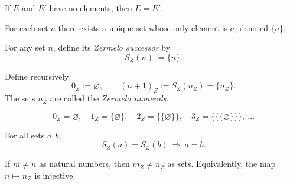 \begin{proposition}
\label{prop:empty-unique}
If $E$ and $E'$ have no elements, then $E=E'$.
\end{proposition}



\begin{proposition}
\label{prop:singleton-well-defined}
For each set $a$ there exists a unique set whose only element is $a$, denoted $\{a\}$.
\end{proposition}



\begin{definition}
\label{def:zermelo-successor}
For any set $n$, define its \emph{Zermelo successor} by
\[
S_Z(n) := \{n\}.
\]
\end{definition}

\begin{definition}
\label{def:zermelo-numerals}
Define recursively:
\[
0_Z := \varnothing,\qquad (n+1)_Z := S_Z(n_Z)=\{n_Z\}.
\]
The sets $n_Z$ are called the \emph{Zermelo numerals}.
\end{definition}

\begin{proposition}
\label{prop:zermelo-first-few}
\[
0_Z=\varnothing,\quad
1_Z=\{\varnothing\},\quad
2_Z=\{\{\varnothing\}\},\quad
3_Z=\{\{\{\varnothing\}\}\},\ \dots
\]
\end{proposition}



\begin{proposition}
\label{prop:zermelo-successor-injective}
For all sets $a,b$,
\[
S_Z(a)=S_Z(b)\ \Rightarrow\ a=b.
\]
\end{proposition}



\begin{proposition}
\label{prop:zermelo-distinct}
If $m\neq n$ as natural numbers, then $m_Z \neq n_Z$ as sets.
Equivalently, the map $n\mapsto n_Z$ is injective.
\end{proposition}



